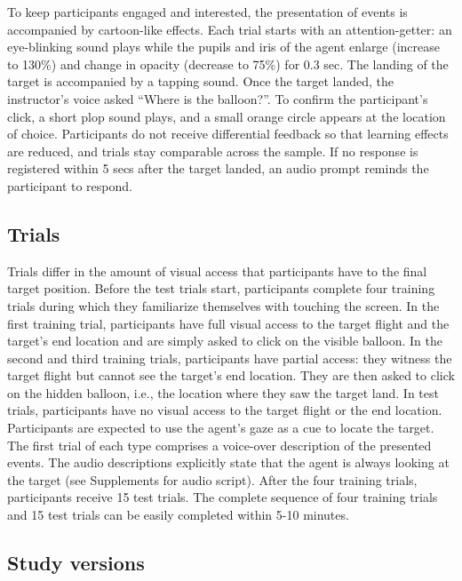 \documentclass[
  man,floatsintext]{apa7}
\begin{document}
To keep participants engaged and interested, the presentation of events is accompanied by cartoon-like effects.
Each trial starts with an attention-getter: an eye-blinking sound plays while the pupils and iris of the agent enlarge (increase to 130\%) and change in opacity (decrease to 75\%) for 0.3 sec.
The landing of the target is accompanied by a tapping sound.
Once the target landed, the instructor's voice asked ``Where is the balloon?''.
To confirm the participant's click, a short plop sound plays, and a small orange circle appears at the location of choice.
Participants do not receive differential feedback so that learning effects are reduced, and trials stay comparable across the sample.
If no response is registered within 5 secs after the target landed, an audio prompt reminds the participant to respond.

\hypertarget{trials}{%
\subsection{Trials}\label{trials}}

Trials differ in the amount of visual access that participants have to the final target position.
Before the test trials start, participants complete four training trials during which they familiarize themselves with touching the screen.
In the first training trial, participants have full visual access to the target flight and the target's end location and are simply asked to click on the visible balloon.
In the second and third training trials, participants have partial access: they witness the target flight but cannot see the target's end location.
They are then asked to click on the hidden balloon, i.e., the location where they saw the target land.
In test trials, participants have no visual access to the target flight or the end location.
Participants are expected to use the agent's gaze as a cue to locate the target.
The first trial of each type comprises a voice-over description of the presented events.
The audio descriptions explicitly state that the agent is always looking at the target (see Supplements for audio script).
After the four training trials, participants receive 15 test trials.
The complete sequence of four training trials and 15 test trials can be easily completed within 5-10 minutes.

\hypertarget{study-versions}{%
\subsection{Study versions}\label{study-versions}}
\end{document}
